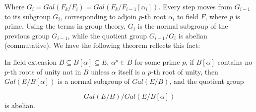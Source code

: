 \documentclass[b5paper]{article}
\begin{document}
Where $G_i = Gal(F_k/F_i) = Gal(F_k/F_{i-1}[\alpha_i])$. Every step moves from $G_{i-1}$ to its subgroup $G_i$, corresponding to adjoin $p$-th root $\alpha_i$ to field $F$, where $p$ is prime. Using the terms in group theory, $G_i$ is the normal subgroup of the previous group $G_{i-1}$, while the quotient group $G_{i-1}/G_i$ is abelian (commutative). We have the following theorem reflects this fact:

\begin{theorem}
In field extension $B \subseteq B[\alpha] \subseteq E$, $\alpha^p \in B$ for some prime $p$, if $B[\alpha]$ contains no $p$-th roots of unity not in $B$ unless $\alpha$ itself is a $p$-th root of unity, then $Gal(E/B[\alpha])$ is a normal subgroup of $Gal(E/B)$, and the quotient group

\[
Gal(E/B) / Gal(E/B[\alpha])
\]
is abelian.

\end{theorem}
\end{document}
